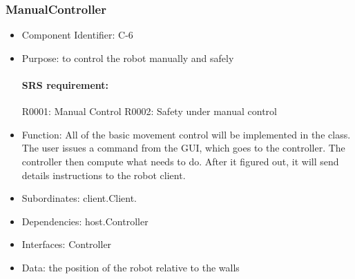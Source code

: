 \documentclass[11pt, a4paper]{report}
\begin{document}
\subsubsection{ManualController}
\begin{itemize}
\item Component Identifier: C-6
\item Purpose: to  control the robot manually and safely  
\paragraph{SRS requirement:} R0001: Manual Control R0002: Safety under manual control
\item Function: All of the basic movement control will be implemented in the class.
The user issues a command from the GUI, which goes to the controller. The controller then
compute what needs to do. After it figured out, it will send details instructions to 
the robot client. 
\item Subordinates: client.Client.
\item Dependencies: host.Controller
\item Interfaces: Controller
\item Data: the position of the robot relative to the walls
\end{itemize}
\end{document}

